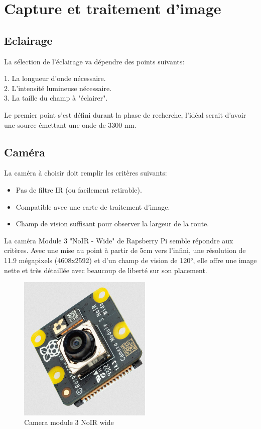 \section{Capture et traitement d'image}
\subsection{Eclairage}
La sélection de l'éclairage va dépendre des points suivants:
\begin{listage}
    1. La longueur d'onde nécessaire.\\
    2. L'intensité lumineuse nécessaire.\\
    3. La taille du champ à "éclairer".
\end{listage}
Le premier point s'est défini durant la phase de recherche, l'idéal serait d'avoir une source émettant une onde de 3300 \si{\nano\metre}.

\subsection{Caméra}
La caméra à choisir doit remplir les critères suivants:
\begin{itemize}
    \item Pas de filtre IR (ou facilement retirable).
    \item Compatible avec une carte de traitement d'image.
    \item Champ de vision suffisant pour observer la largeur de la route.
\end{itemize}

La caméra Module 3 "NoIR - Wide" de Rapsberry Pi \cite{camera} semble répondre aux critères. Avec une mise au point à partir de 5cm vers l'infini,
une résolution de 11.9 mégapixels (4608x2592) et d'un champ de vision de \ang{120}, elle offre une image nette et très détaillée avec beaucoup de liberté sur
son placement.
\begin{figure}[H]
    \centering
    \includegraphics[height=7cm,angle=-90]{assets/figures/camera.png}
    \caption{Camera module 3 NoIR wide}
\end{figure}

